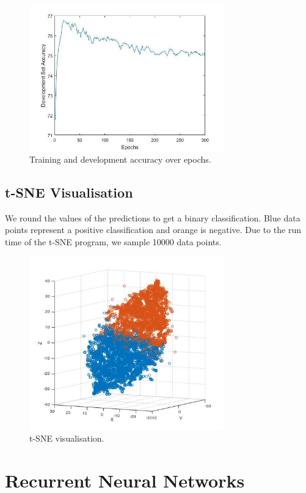 \documentclass{article} %
\begin{document}
\begin{figure}[H]
\centering
\includegraphics[width=0.75\textwidth]{graphics/devaccuracy.jpg}
\caption{Training and development accuracy over epochs.}
\end{figure}

\subsection{t-SNE Visualisation}

We round the values of the predictions to get a binary classification. Blue data points represent a positive classification and orange is negative. Due to the run time of the t-SNE program, we sample 10000 data points.

\begin{figure}[H]
\centering
\includegraphics[width=0.75\textwidth]{graphics/tsneplot.jpg}
\caption{t-SNE visualisation.}
\end{figure}

\section{Recurrent Neural Networks}
\end{document}
